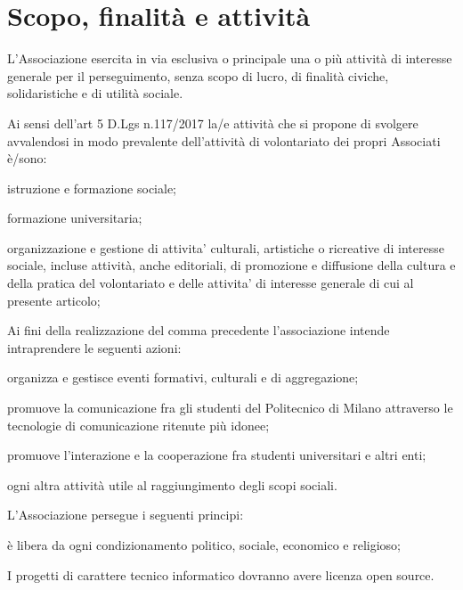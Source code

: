 \documentclass[legalpaper, 11pt]{exam}
\let\tempone\enumerate
\let\temptwo\endenumerate
\renewenvironment{enumerate}{\tempone\addtolength{\itemsep}{-0.45\baselineskip}}{\temptwo}
\begin{document}
{\section{Scopo, finalità e attività}
\vspace{-5pt}
\begin{enumerate}
 \item L’Associazione esercita in via esclusiva o principale una o più attività di interesse generale per il perseguimento, senza scopo di lucro, di finalità civiche, solidaristiche e di utilità sociale.
 \item Ai sensi dell’art 5 D.Lgs n.117/2017 la/e attività che si propone di svolgere avvalendosi in modo prevalente dell’attività di volontariato dei propri Associati è/sono:
 \begin{enumerate}
	\item istruzione e formazione sociale;
	\item formazione universitaria;
	\item organizzazione e gestione di attivita' culturali, artistiche o ricreative di interesse sociale, incluse attività, anche editoriali, di promozione e diffusione della cultura e della pratica	del volontariato e delle attivita' di interesse generale di cui al presente articolo;
 \end{enumerate}
 \item Ai fini della realizzazione del comma precedente l’associazione intende intraprendere le seguenti azioni:
 \begin{enumerate}
	\item organizza e gestisce eventi formativi, culturali e di aggregazione;
	\item promuove la comunicazione fra gli studenti del Politecnico di Milano attraverso le tecnologie	di comunicazione ritenute più idonee;
	\item promuove l’interazione e la cooperazione fra studenti universitari e altri enti;
	\item ogni altra attività utile al raggiungimento degli scopi sociali.
 \end{enumerate}
 \item L’Associazione persegue i seguenti principi:
 \begin{enumerate}
	\item è libera da ogni condizionamento politico, sociale, economico e religioso;
	\item I progetti di carattere tecnico informatico dovranno avere licenza open source.
 \end{enumerate}
\end{enumerate}

}
\end{document}
